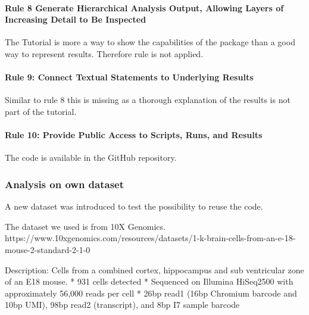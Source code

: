 \hypertarget{rule-8-generate-hierarchical-analysis-output-allowing-layers-of-increasing-detail-to-be-inspected}{%
\paragraph{Rule 8 Generate Hierarchical Analysis Output, Allowing Layers
of Increasing Detail to Be
Inspected}\label{rule-8-generate-hierarchical-analysis-output-allowing-layers-of-increasing-detail-to-be-inspected}}

The Tutorial is more a way to show the capabilities of the package than
a good way to represent results. Therefore rule is not applied.

\hypertarget{rule-9-connect-textual-statements-to-underlying-results}{%
\paragraph{Rule 9: Connect Textual Statements to Underlying
Results}\label{rule-9-connect-textual-statements-to-underlying-results}}

Similar to rule 8 this is missing as a thorough explanation of the
results is not part of the tutorial.

\hypertarget{rule-10-provide-public-access-to-scripts-runs-and-results}{%
\paragraph{Rule 10: Provide Public Access to Scripts, Runs, and
Results}\label{rule-10-provide-public-access-to-scripts-runs-and-results}}

The code is available in the GitHub repository.

\hypertarget{analysis-on-own-dataset}{%
\subsubsection{Analysis on own dataset}\label{analysis-on-own-dataset}}

A new dataset was introduced to test the possibility to reuse the code.

The dataset we used is from 10X Genomics.
https://www.10xgenomics.com/resources/datasets/1-k-brain-cells-from-an-e-18-mouse-2-standard-2-1-0

Description: Cells from a combined cortex, hippocampus and sub
ventricular zone of an E18 mouse. * 931 cells detected * Sequenced on
Illumina HiSeq2500 with approximately 56,000 reads per cell * 26bp read1
(16bp Chromium barcode and 10bp UMI), 98bp read2 (transcript), and 8bp
I7 sample barcode

